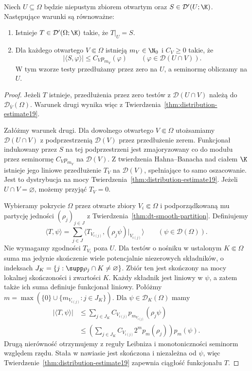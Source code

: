 \begin{twierdzenie}
\label{thm:dt-extension-local-estimate}
Niech $U\subseteq\Omega$ będzie niepustym zbiorem otwartym
oraz $S\in\mathcal D'(U;\K)$. Następujące warunki są
równoważne:
\begin{enumerate}
 \item Istnieje $T\in\mathcal D'(\Omega;\K)$ takie, że
 $T|_U=S$.
 \item Dla każdego otwartego $V\Subset\Omega$ istnieją
 $m_V\in\N_0$ i $C_V\ge0$ takie, że
 \[
  |\langle S,\varphi\rangle|\le C_V p_{m_V}(\varphi)
  \qquad(\varphi\in\mathcal D(U\cap V)).
 \]
 W tym wzorze testy przedłużamy przez zero na $U$,
 a seminormę obliczamy na $U$.
\end{enumerate}
\end{twierdzenie}
\begin{proof}
Jeżeli $T$ istnieje, przedłużenia przez zero testów z
$\mathcal D(U\cap V)$ należą do
$\mathcal D_{\overline V}(\Omega)$.
Warunek drugi wynika więc z
Twierdzenia~\ref{thm:distribution-estimate19}.

Załóżmy warunek drugi. Dla dowolnego otwartego
$V\Subset\Omega$ utożsamiamy $\mathcal D(U\cap V)$
z podprzestrzenią $\mathcal D(V)$ przez przedłużenie zerem.
Funkcjonał indukowany przez $S$ na tej podprzestrzeni
jest zmajoryzowany co do modułu przez seminormę
$C_V p_{m_V}$ na $\mathcal D(V)$.
Z twierdzenia Hahna--Banacha nad ciałem $\K$ istnieje
jego liniowe przedłużenie $T_V$ na $\mathcal D(V)$,
spełniające to samo oszacowanie.
Jest to dystrybucja na mocy
Twierdzenia~\ref{thm:distribution-estimate19}.
Jeżeli $U\cap V=\varnothing$, możemy przyjąć $T_V=0$.

Wybieramy pokrycie $\Omega$ przez otwarte zbiory
$V_i\Subset\Omega$ i podporządkowaną mu partycję jedności
$(\rho_j)_{j\in J}$ z
Twierdzenia~\ref{thm:dt-smooth-partition}.
Definiujemy
\[
 \langle T,\psi\rangle=
 \sum_{j\in J}
 \langle T_{V_{i(j)}},(\rho_j\psi)|_{V_{i(j)}}\rangle
 \qquad(\psi\in\mathcal D(\Omega)).
\]
Nie wymagamy zgodności $T_{V_i}$ poza $U$.
Dla testów o nośniku w ustalonym $K\Subset\Omega$
suma ma jedynie skończenie wiele potencjalnie
niezerowych składników, o indeksach
$J_K=\{j:\supp\rho_j\cap K\ne\varnothing\}$.
Zbiór ten jest skończony na mocy lokalnej skończoności
i zwartości $K$. Każdy składnik jest liniowy w $\psi$,
a zatem także ich suma definiuje funkcjonał liniowy.
Połóżmy $m=\max(\{0\}\cup\{m_{V_{i(j)}}:j\in J_K\})$.
Dla $\psi\in\mathcal D_K(\Omega)$ mamy
\[
\begin{aligned}
 |\langle T,\psi\rangle|
 &\le\sum_{j\in J_K} C_{V_{i(j)}}
                   p_{m_{V_{i(j)}}}(\rho_j\psi)\\
 &\le\left(\sum_{j\in J_K} C_{V_{i(j)}}2^m
                        p_m(\rho_j)\right)p_m(\psi).
\end{aligned}
\]
Drugą nierówność otrzymujemy z reguły Leibniza
i monotoniczności seminorm względem rzędu.
Stała w nawiasie jest skończona i niezależna od $\psi$,
więc Twierdzenie~\ref{thm:distribution-estimate19}
zapewnia ciągłość funkcjonału $T$.


\end{proof}
